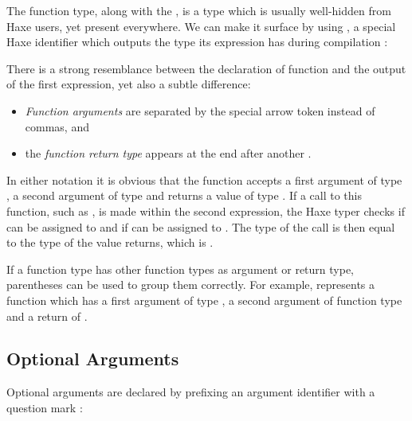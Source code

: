 {

The function type, along with the , is a type which is usually well-hidden from Haxe users, yet present everywhere. We can make it surface by using , a special Haxe identifier which outputs the type its expression has during compilation :


There is a strong resemblance between the declaration of function  and the output of the first  expression, yet also a subtle difference:

\begin{itemize}
	\item \emph{Function arguments} are separated by the special arrow token \expr{->} instead of commas, and
	\item the \emph{function return type} appears at the end after another \expr{->}.
\end{itemize}

In either notation it is obvious that the function  accepts a first argument of type , a second argument of type  and returns a value of type . If a call to this function, such as , is made within the second  expression, the Haxe typer checks if  can be assigned to  and if  can be assigned to . The type of the call is then equal to the type of the value  returns, which is .

If a function type has other function types as argument or return type, parentheses can be used to group them correctly. For example,  represents a function which has a first argument of type , a second argument of function type  and a return of .



\subsection{Optional Arguments}
\label{types-function-optional-arguments}

Optional arguments are declared by prefixing an argument identifier with a question mark :

}
